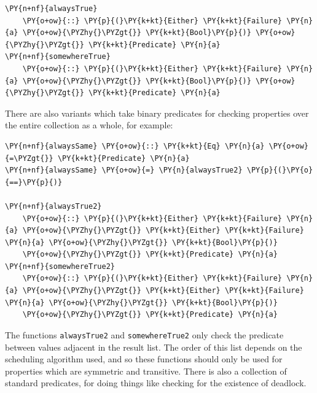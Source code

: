 \begin{Verbatim}[commandchars=\\\{\}]
\PY{n+nf}{alwaysTrue}
    \PY{o+ow}{::} \PY{p}{(}\PY{k+kt}{Either} \PY{k+kt}{Failure} \PY{n}{a} \PY{o+ow}{\PYZhy{}\PYZgt{}} \PY{k+kt}{Bool}\PY{p}{)} \PY{o+ow}{\PYZhy{}\PYZgt{}} \PY{k+kt}{Predicate} \PY{n}{a}
\PY{n+nf}{somewhereTrue}
    \PY{o+ow}{::} \PY{p}{(}\PY{k+kt}{Either} \PY{k+kt}{Failure} \PY{n}{a} \PY{o+ow}{\PYZhy{}\PYZgt{}} \PY{k+kt}{Bool}\PY{p}{)} \PY{o+ow}{\PYZhy{}\PYZgt{}} \PY{k+kt}{Predicate} \PY{n}{a}
\end{Verbatim}

There are also variants which take binary predicates for checking
properties over the entire collection as a whole, for example:

%

\begin{Verbatim}[commandchars=\\\{\}]
\PY{n+nf}{alwaysSame} \PY{o+ow}{::} \PY{k+kt}{Eq} \PY{n}{a} \PY{o+ow}{=\PYZgt{}} \PY{k+kt}{Predicate} \PY{n}{a}
\PY{n+nf}{alwaysSame} \PY{o+ow}{=} \PY{n}{alwaysTrue2} \PY{p}{(}\PY{o}{==}\PY{p}{)}

\PY{n+nf}{alwaysTrue2}
    \PY{o+ow}{::} \PY{p}{(}\PY{k+kt}{Either} \PY{k+kt}{Failure} \PY{n}{a} \PY{o+ow}{\PYZhy{}\PYZgt{}} \PY{k+kt}{Either} \PY{k+kt}{Failure} \PY{n}{a} \PY{o+ow}{\PYZhy{}\PYZgt{}} \PY{k+kt}{Bool}\PY{p}{)}
    \PY{o+ow}{\PYZhy{}\PYZgt{}} \PY{k+kt}{Predicate} \PY{n}{a}
\PY{n+nf}{somewhereTrue2}
    \PY{o+ow}{::} \PY{p}{(}\PY{k+kt}{Either} \PY{k+kt}{Failure} \PY{n}{a} \PY{o+ow}{\PYZhy{}\PYZgt{}} \PY{k+kt}{Either} \PY{k+kt}{Failure} \PY{n}{a} \PY{o+ow}{\PYZhy{}\PYZgt{}} \PY{k+kt}{Bool}\PY{p}{)}
    \PY{o+ow}{\PYZhy{}\PYZgt{}} \PY{k+kt}{Predicate} \PY{n}{a}
\end{Verbatim}

The functions \texttt{alwaysTrue2} and \texttt{somewhereTrue2} only
check the predicate between values adjacent in the result list. The
order of this list depends on the scheduling algorithm used, and so
these functions should only be used for properties which are symmetric
and transitive. There is also a collection of standard predicates, for
doing things like checking for the existence of deadlock.

